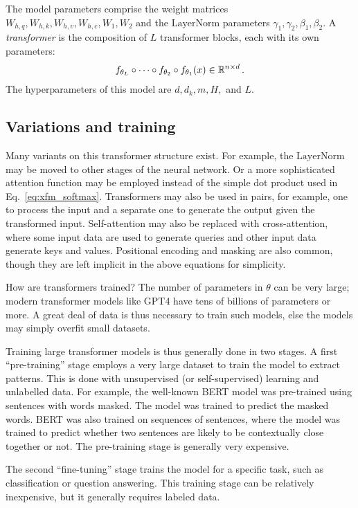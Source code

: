 The model parameters comprise the weight matrices $W_{h,q}, W_{h,k}, W_{h,v}, W_{h,c}, W_1, W_2$ and the $\text{LayerNorm}$ parameters $\gamma_1, \gamma_2, \beta_1, \beta_2$.  A {\em transformer} is the composition of $L$ transformer blocks, each with its own parameters:
\begin{eqnarray}
  f_{\theta_L} \circ  \cdots \circ f_{\theta_2} \circ f_{\theta_1}(x) \in \mathbb{R}^{n\times d}
  \,.
\end{eqnarray}
The hyperparameters of this model are $d, d_k, m, H,$ and $L.$




\subsection{Variations and training}

Many variants on this transformer structure exist.  For example, the $\text{LayerNorm}$ may be moved to other stages of the neural network.  Or a more sophisticated attention function may be employed instead of the simple dot product used in Eq.~\ref{eq:xfm_softmax}.  Transformers may also be used in pairs, for example, one to process the input and a separate one to generate the output given the transformed input.  Self-attention may also be replaced with cross-attention, where some input data are used to generate queries and other input data generate keys and values.  Positional encoding and masking are also common, though they are left implicit in the above equations for simplicity.

How are transformers trained?  The number of parameters in $\theta$ can be very large; modern transformer models like GPT4 have tens of billions of parameters or more.  A great deal of data is thus necessary to train such models, else the models may simply overfit small datasets.

Training large transformer models is thus generally done in two stages.  A first ``pre-training'' stage employs a very large dataset to train the model to extract patterns.  This is done with unsupervised (or self-supervised) learning and unlabelled data.  For example, the well-known BERT model was pre-trained using sentences with words masked.  The model was trained to predict the masked words.  BERT was also trained on sequences of sentences, where the model was trained to predict whether two sentences are likely to be contextually close together or not. The pre-training stage is generally very expensive.

The second ``fine-tuning'' stage trains the model for a specific task, such as classification or question answering.  This training stage can be relatively inexpensive, but it generally requires labeled data.



